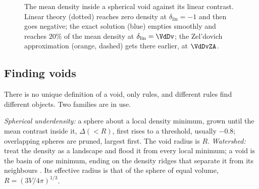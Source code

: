 \begin{figure}[htbp]
\centering
{}
\caption{The mean density inside a spherical void against its linear contrast.
Linear theory (dotted) reaches zero density at $\delta_{\mathrm{lin}}=-1$ and
then goes negative; the exact solution (blue) empties smoothly and reaches
$20\%$ of the mean density at $\delta_{\mathrm{lin}}=\VdDv$; the Zel'dovich
approximation (orange, dashed) gets there earlier, at $\VdDvZA$.}
\label{11b:fig:void-evolution}
\end{figure}

\subsection{Finding voids}
\label{11b:sec:voids-finder}

There is no unique definition of a void, only rules, and different rules find
different objects. Two families are in use.

\begin{workdef}
\emph{Spherical underdensity:} a sphere about a local density minimum, grown until
the mean contrast inside it, $\Delta(<R)$, first rises to a threshold, usually
$-0.8$; overlapping spheres are pruned, largest first. The void radius is $R$.
\emph{Watershed:} treat the density as a landscape and flood it from every local
minimum; a void is the basin of one minimum, ending on the density ridges that
separate it from its neighbours \cite{Platen2007,Neyrinck2008}. Its effective
radius is that of the sphere of equal volume, $R=(3V/4\pi)^{1/3}$.
\end{workdef}

